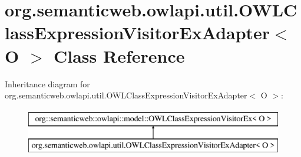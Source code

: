 \hypertarget{classorg_1_1semanticweb_1_1owlapi_1_1util_1_1_o_w_l_class_expression_visitor_ex_adapter_3_01_o_01_4}{\section{org.\-semanticweb.\-owlapi.\-util.\-O\-W\-L\-Class\-Expression\-Visitor\-Ex\-Adapter$<$ O $>$ Class Reference}
\label{classorg_1_1semanticweb_1_1owlapi_1_1util_1_1_o_w_l_class_expression_visitor_ex_adapter_3_01_o_01_4}
}
Inheritance diagram for org.\-semanticweb.\-owlapi.\-util.\-O\-W\-L\-Class\-Expression\-Visitor\-Ex\-Adapter$<$ O $>$\-:\begin{figure}[H]
\begin{center}
\leavevmode
\includegraphics[height=2.000000cm]{classorg_1_1semanticweb_1_1owlapi_1_1util_1_1_o_w_l_class_expression_visitor_ex_adapter_3_01_o_01_4}
\end{center}
\end{figure}
